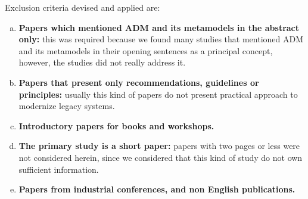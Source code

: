 Exclusion criteria devised and applied are:
\begin{enumerate}[(a)]

\item \textbf{Papers which mentioned ADM and its metamodels in the abstract only:} this was required because we found many studies that mentioned ADM and its metamodels in their opening sentences as a principal concept, however, the studies did not really address it.

\item \textbf{Papers that present only recommendations, guidelines or principles:} usually this kind of papers do not present practical approach to modernize legacy systems.

\item \textbf{Introductory papers for books and workshops.}

\item \textbf{The primary study is a short paper:} papers with two pages or less were not considered herein, since we considered that this kind of study do not own sufficient information.

\item \textbf{Papers from industrial conferences, and non English publications.}
 
\end{enumerate}







